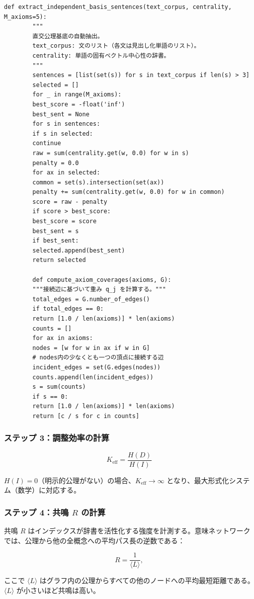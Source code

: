 \documentclass[11pt,a4paper]{article}
\begin{document}
	\begin{lstlisting}[caption={独立公理基底抽出関数}, label={lst:basis}]
		def extract_independent_basis_sentences(text_corpus, centrality, M_axioms=5):
		"""
		直交公理基底の自動抽出。
		text_corpus: 文のリスト（各文は見出し化単語のリスト）。
		centrality: 単語の固有ベクトル中心性の辞書。
		"""
		sentences = [list(set(s)) for s in text_corpus if len(s) > 3]
		selected = []
		for _ in range(M_axioms):
		best_score = -float('inf')
		best_sent = None
		for s in sentences:
		if s in selected:
		continue
		raw = sum(centrality.get(w, 0.0) for w in s)
		penalty = 0.0
		for ax in selected:
		common = set(s).intersection(set(ax))
		penalty += sum(centrality.get(w, 0.0) for w in common)
		score = raw - penalty
		if score > best_score:
		best_score = score
		best_sent = s
		if best_sent:
		selected.append(best_sent)
		return selected
		
		def compute_axiom_coverages(axioms, G):
		"""接続辺に基づいて重み q_j を計算する。"""
		total_edges = G.number_of_edges()
		if total_edges == 0:
		return [1.0 / len(axioms)] * len(axioms)
		counts = []
		for ax in axioms:
		nodes = [w for w in ax if w in G]
		# nodes内の少なくとも一つの頂点に接続する辺
		incident_edges = set(G.edges(nodes))
		counts.append(len(incident_edges))
		s = sum(counts)
		if s == 0:
		return [1.0 / len(axioms)] * len(axioms)
		return [c / s for c in counts]
	\end{lstlisting}
	
	\subsubsection{ステップ 3：調整効率の計算}
	
	\[
	\boxed{
		K_{\mathrm{eff}} = \frac{H(D)}{H(I)}
	}
	\]
	
	\(H(I) = 0\)（明示的公理がない）の場合、\(K_{\mathrm{eff}} \to \infty\) となり、最大形式化システム（数学）に対応する。
	
	\subsubsection{ステップ 4：共鳴 \(R\) の計算}
	
	共鳴 \(R\) はインデックスが辞書を活性化する強度を計測する。意味ネットワークでは、公理から他の全概念への平均パス長の逆数である：
	
	\[
	R = \frac{1}{\langle L \rangle},
	\]
	
	ここで \(\langle L \rangle\) はグラフ内の公理からすべての他のノードへの平均最短距離である。\(\langle L \rangle\) が小さいほど共鳴は高い。
	
\end{document}
